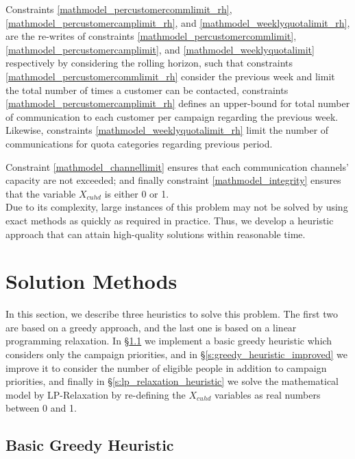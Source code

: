 \documentclass[11pt]{article}
\begin{document}
Constraints \eqref{mathmodel_percustomercommlimit_rh}, \eqref{mathmodel_percustomercamplimit_rh}, and \eqref{mathmodel_weeklyquotalimit_rh}, are the re-writes of constraints \eqref{mathmodel_percustomercommlimit}, \eqref{mathmodel_percustomercamplimit}, and \eqref{mathmodel_weeklyquotalimit} respectively by considering the rolling horizon, such that constraints \eqref{mathmodel_percustomercommlimit_rh} consider the previous week and limit the total number of times a customer can be contacted, constraints \eqref{mathmodel_percustomercamplimit_rh} defines an upper-bound for total number of communication to each customer per campaign regarding the previous week. Likewise, constraints \eqref{mathmodel_weeklyquotalimit_rh} limit the number of communications for quota categories regarding previous period.

Constraint \eqref{mathmodel_channellimit} ensures that each communication channels' capacity are not exceeded; and finally constraint \eqref{mathmodel_integrity} ensures that the variable $X_{{c}{u}{h}{d}}$ is either 0 or 1.
\\

Due to its complexity, large instances of this problem may not be solved by using exact methods as quickly as required in practice. Thus, we develop a heuristic approach that can attain high-quality solutions within reasonable time.


\section{Solution Methods}  \label{s:solution-method}

In this section, we describe three heuristics to solve this problem. The first two are based on a greedy approach, and the last one is based on a linear programming relaxation. In \S \ref{s:greedy_heuristic_basic} we implement a basic greedy heuristic which considers only the campaign priorities, and in \S \ref{s:greedy_heuristic_improved} we improve it to consider the number of eligible people in addition to campaign priorities, and finally in \S \ref{s:lp_relaxation_heuristic} we solve the mathematical model by LP-Relaxation by re-defining the  $X_{{c}{u}{h}{d}}$ variables as real numbers between 0 and 1.

\subsection{Basic Greedy Heuristic} \label{s:greedy_heuristic_basic}
\end{document}
